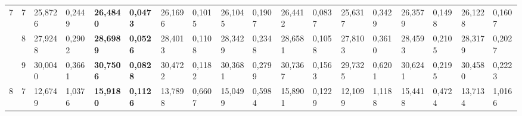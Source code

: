 \documentclass[conference]{IEEEtran}
\begin{document}
\begin{table*}[]
\begin{tabular}{|cc|ll|ll|ll|ll|ll|ll|ll|ll|}
		\multicolumn{1}{|c|}{\multirow{3}{*}{7}}  & 7          & \multicolumn{1}{l|}{25,8726}           & 0,2449                            & \multicolumn{1}{l|}{\textbf{26,4840}}  & \textbf{0,0473}                   & \multicolumn{1}{l|}{26,1696}           & 0,1015                            & \multicolumn{1}{l|}{26,1045}           & 0,1907                            & \multicolumn{1}{l|}{26,4412}           & 0,0837                            & \multicolumn{1}{l|}{25,6317}           & 0,3429                            & \multicolumn{1}{l|}{26,3579}           & 0,1498                            & \multicolumn{1}{l|}{26,1228}           & 0,1607                            \\ \cline{2-18} 
		\multicolumn{1}{|c|}{}                    & 8          & \multicolumn{1}{l|}{27,9248}           & 0,2902                            & \multicolumn{1}{l|}{\textbf{28,6989}}  & \textbf{0,0526}                   & \multicolumn{1}{l|}{28,4013}           & 0,1108                            & \multicolumn{1}{l|}{28,3429}           & 0,2348                            & \multicolumn{1}{l|}{28,6581}           & 0,1058                            & \multicolumn{1}{l|}{27,8103}           & 0,3610                            & \multicolumn{1}{l|}{28,4593}           & 0,2105                            & \multicolumn{1}{l|}{28,3179}           & 0,2027                            \\ \cline{2-18} 
		\multicolumn{1}{|c|}{}                    & 9          & \multicolumn{1}{l|}{30,0040}           & 0,3661                            & \multicolumn{1}{l|}{\textbf{30,7506}}  & \textbf{0,0828}                   & \multicolumn{1}{l|}{30,4722}           & 0,1182                            & \multicolumn{1}{l|}{30,3681}           & 0,2799                            & \multicolumn{1}{l|}{30,7367}           & 0,1563                            & \multicolumn{1}{l|}{29,7325}           & 0,6201                            & \multicolumn{1}{l|}{30,6241}           & 0,2195                            & \multicolumn{1}{l|}{30,4580}           & 0,2223                            \\ \hline
		\multicolumn{1}{|c|}{\multirow{3}{*}{8}}  & 7          & \multicolumn{1}{l|}{12,6749}           & 1,0376                            & \multicolumn{1}{l|}{\textbf{15,9180}}  & \textbf{0,1126}                   & \multicolumn{1}{l|}{13,7898}           & 0,6607                            & \multicolumn{1}{l|}{15,0499}           & 0,5984                            & \multicolumn{1}{l|}{15,8901}           & 0,1229                            & \multicolumn{1}{l|}{12,1099}           & 1,1188                            & \multicolumn{1}{l|}{15,4418}           & 0,4724                            & \multicolumn{1}{l|}{13,7134}           & 1,0166                            \\ \cline{2-18} 

\end{tabular}
\end{table*}
\end{document}
